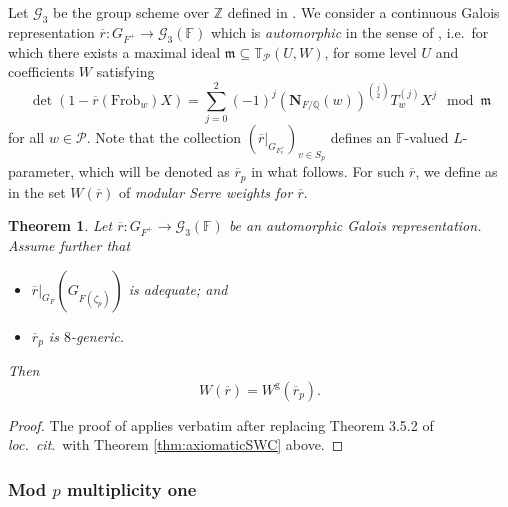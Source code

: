 \documentclass[oneside,a4paper,english, 11pt]{amsart}
\theoremstyle{plain}
\newtheorem{thm}{Theorem}[subsection]
\theoremstyle{plain}
\theoremstyle{plain}
\theoremstyle{plain}
\theoremstyle{plain}
\theoremstyle{plain}
\theoremstyle{definition}
\theoremstyle{definition}
\theoremstyle{definition}
\theoremstyle{remark}
\numberwithin{equation}{section}
\newcommand{\Q}{\mathbb{Q}}
\newcommand{\F}{\mathbb{F}}
\newcommand{\fm}{\mathfrak{m}}
\newcommand{\bT}{\mathbb{T}}
\newcommand{\cG}{\mathcal{G}}
\newcommand{\cP}{\mathcal{P}}
\newcommand{\rbar}{\overline{r}}
\newcommand{\ra}{\rightarrow}
\begin{document}
Let $\cG_3$ be the group scheme over $\mathbb Z$ defined in \cite[\S 2.1]{CHT}.
We consider a continuous Galois representation $\rbar: G_{F^+} \ra \cG_3(\F)$ which is \emph{automorphic} in the sense of \cite{MLM}, i.e.~for which there exists a maximal ideal $\fm\subseteq \bT_{\cP}(U,W)$, for some level $U$ and coefficients $W$ satisfying
\[
\det\left(1-\rbar(\mathrm{Frob}_w)X\right)=\sum_{j=0}^2 (-1)^j(\mathbf{N}_{F/\Q}(w))^{\binom{j}{2}}T_w^{(j)}X^j\mod{\fm}
\]
for all $w\in \cP$.
Note that the collection $(\rbar|_{G_{F^+_v}})_{v\in S_p}$ defines an $\F$-valued $L$-parameter, which will be denoted as $\rbar_p$ in what follows.
For such $\rbar$, we define as in \cite[Definition 9.1.1]{MLM} the set $W(\rbar)$ of \emph{modular Serre weights for $\rbar$}.

\begin{thm}\label{thm:SWC}
Let $\rbar: G_{F^+} \ra \cG_3(\F)$ be an automorphic Galois representation.
Assume further that 
\begin{itemize}
\item $\rbar|_{G_F}(G_{F(\zeta_p)})$ is adequate; and
\item $\rbar_p$ is $8$-generic.
\end{itemize}
Then 
\[
W(\rbar) = W^{\mathrm{g}}(\rbar_p).
\]
\end{thm}
\begin{proof}
The proof of \cite[Theorem 5.3.3]{LLLM2} applies verbatim after replacing Theorem 3.5.2 of \emph{loc.~cit}.~with Theorem \ref{thm:axiomaticSWC} above.
\end{proof}
%


\subsubsection{Mod $p$ multiplicity one}\label{subsec:multone}
\end{document}
